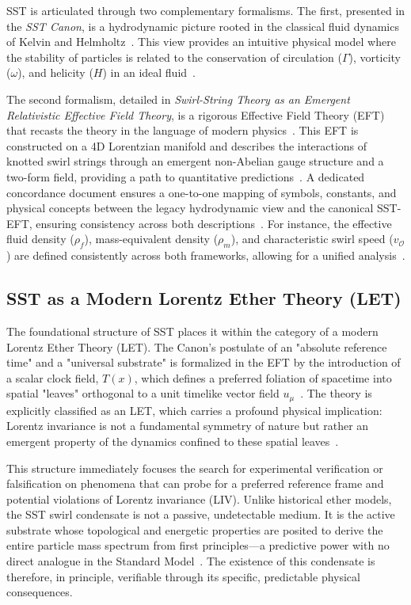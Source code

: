 \documentclass[11pt, a4paper]{article}
\begin{document}
        SST is articulated through two complementary formalisms. The first, presented in the \textit{SST Canon}, is a hydrodynamic picture rooted in the classical fluid dynamics of Kelvin and Helmholtz~\cite{sst_canon}. This view provides an intuitive physical model where the stability of particles is related to the conservation of circulation ($\Gamma$), vorticity ($\omega$), and helicity ($H$) in an ideal fluid~\cite{sst_canon}.

        The second formalism, detailed in \textit{Swirl-String Theory as an Emergent Relativistic Effective Field Theory}, is a rigorous Effective Field Theory (EFT) that recasts the theory in the language of modern physics~\cite{sst_canon}. This EFT is constructed on a 4D Lorentzian manifold and describes the interactions of knotted swirl strings through an emergent non-Abelian gauge structure and a two-form field, providing a path to quantitative predictions~\cite{sst_canon}. A dedicated concordance document ensures a one-to-one mapping of symbols, constants, and physical concepts between the legacy hydrodynamic view and the canonical SST-EFT, ensuring consistency across both descriptions~\cite{sst_canon}. For instance, the effective fluid density ($\rho_f$), mass-equivalent density ($\rho_m$), and characteristic swirl speed ($v_{\mathcal{O}}$) are defined consistently across both frameworks, allowing for a unified analysis~\cite{sst_canon}.

    \subsection{SST as a Modern Lorentz Ether Theory (LET)}

        The foundational structure of SST places it within the category of a modern Lorentz Ether Theory (LET). The Canon's postulate of an "absolute reference time" and a "universal substrate" is formalized in the EFT by the introduction of a scalar clock field, $T(x)$, which defines a preferred foliation of spacetime into spatial "leaves" orthogonal to a unit timelike vector field $u_{\mu}$~\cite{sst_canon}. The theory is explicitly classified as an LET, which carries a profound physical implication: Lorentz invariance is not a fundamental symmetry of nature but rather an emergent property of the dynamics confined to these spatial leaves~\cite{sst_canon}.

        This structure immediately focuses the search for experimental verification or falsification on phenomena that can probe for a preferred reference frame and potential violations of Lorentz invariance (LIV). Unlike historical ether models, the SST swirl condensate is not a passive, undetectable medium. It is the active substrate whose topological and energetic properties are posited to derive the entire particle mass spectrum from first principles—a predictive power with no direct analogue in the Standard Model~\cite{sst_canon}. The existence of this condensate is therefore, in principle, verifiable through its specific, predictable physical consequences.
\end{document}
